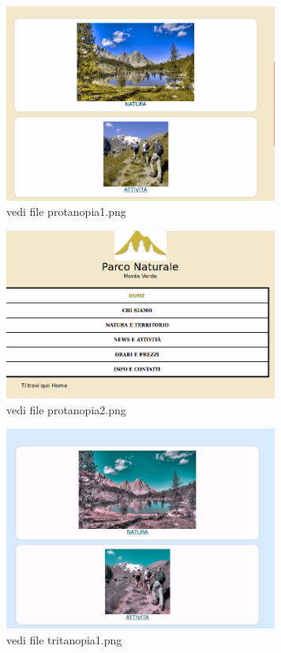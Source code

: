 \documentclass[12pt]{article}
\begin{document}
\begin{itemize}
			\begin{figure}
			\centering
			\includegraphics[width=90mm]{protanopia1}
			\caption{vedi file protanopia1.png}
			\end{figure}


			\begin{figure}
			\centering
			\includegraphics[width=90mm]{protanopia2}
			\caption{vedi file protanopia2.png}
			\end{figure}


			\begin{figure}
			\centering
			\includegraphics[width=90mm]{tritanopia1}
			\caption{vedi file tritanopia1.png}
			\end{figure}
			

\end{itemize}
\end{document}
